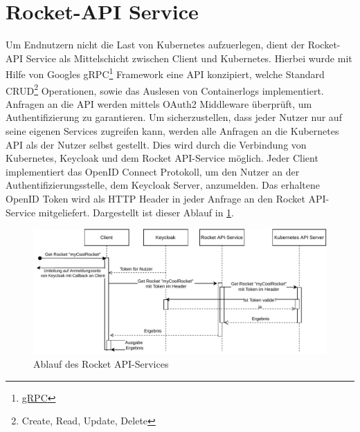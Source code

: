 \section{Rocket-API Service}
\label{sec:komponenten:rocket-api-service}
Um Endnutzern nicht die Last von Kubernetes aufzuerlegen, dient der Rocket-API Service als Mittelschicht zwischen
Client und Kubernetes. Hierbei wurde mit Hilfe von Googles gRPC\footnote{\href{https://grpc.io/}{gRPC}} Framework
eine API konzipiert, welche Standard CRUD\footnote{Create, Read, Update, Delete} Operationen, sowie das Auslesen
von Containerlogs implementiert.
Anfragen an die API werden mittels OAuth2 Middleware überprüft, um Authentifizierung zu garantieren. Um sicherzustellen,
dass jeder Nutzer nur auf seine eigenen Services zugreifen kann, werden alle Anfragen an die Kubernetes API als der
Nutzer selbst gestellt. Dies wird durch die Verbindung von Kubernetes, Keycloak und dem Rocket API-Service möglich.
Jeder Client implementiert das OpenID Connect Protokoll, um den Nutzer an der Authentifizierungsstelle, dem Keycloak
Server, anzumelden. Das erhaltene OpenID Token wird als HTTP Header in jeder Anfrage an den Rocket API-Service 
mitgeliefert. Dargestellt ist dieser Ablauf in \ref{fig:rocket-api-service-flow}.

\begin{figure}[h]
  \centering
  \includegraphics[height=0.5\textwidth]{gfx/chapters/3_komponenten/api-service-flow.pdf}
  \caption{Ablauf des Rocket API-Services}
  \label{fig:rocket-api-service-flow}
\end{figure}